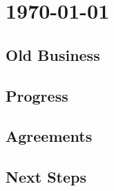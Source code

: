 \documentclass[../minutes.tex]{subfiles}
\begin{document}

\chapter{1970-01-01}
\section{Old Business}
\section{Progress}
\section{Agreements}
\section{Next Steps}

\bib{}
\end{document}
